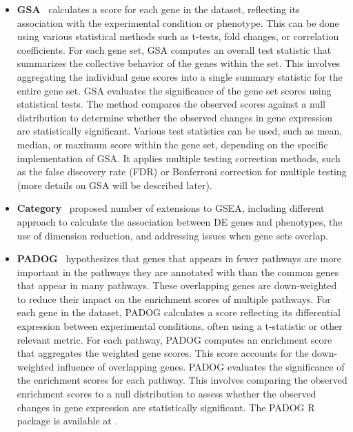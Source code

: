 \begin{itemize}
\item \textbf{GSA}~\cite{Efron:2007} calculates a score for each gene in the dataset, reflecting its association with the experimental condition or phenotype. This can be done using various statistical methods such as t-tests, fold changes, or correlation coefficients. For each gene set, GSA computes an overall test statistic that summarizes the collective behavior of the genes within the set. This involves aggregating the individual gene scores into a single summary statistic for the entire gene set. GSA evaluates the significance of the gene set scores using statistical tests. The method compares the observed scores against a null distribution to determine whether the observed changes in gene expression are statistically significant. Various test statistics can be used, such as mean, median, or maximum score within the gene set, depending on the specific implementation of GSA. It applies multiple testing correction methods, such as the false discovery rate (FDR) or Bonferroni correction for multiple testing (more details on GSA will be described later).

\item \textbf{Category}~\cite{jiang2007extensions} proposed number of extensions to GSEA, including different approach to calculate the association between DE genes and phenotypes, the use of dimension reduction, and addressing issues when gene sets overlap. 

\item \textbf{PADOG}~\cite{Tarca2012down} hypothesizes that genes that appears in fewer pathways are more important in the pathways they are annotated with than the common genes that appear in many pathways.  These overlapping genes are down-weighted to reduce their impact on the enrichment scores of multiple pathways. For each gene in the dataset, PADOG calculates a score reflecting its differential expression between experimental conditions, often using a t-statistic or other relevant metric. For each pathway, PADOG computes an enrichment score that aggregates the weighted gene scores. This score accounts for the down-weighted influence of overlapping genes. PADOG evaluates the significance of the enrichment scores for each pathway. This involves comparing the observed enrichment scores to a null distribution to assess whether the observed changes in gene expression are statistically significant. The PADOG R package is available at \cite{TarcaPADOG}.


\end{itemize}
